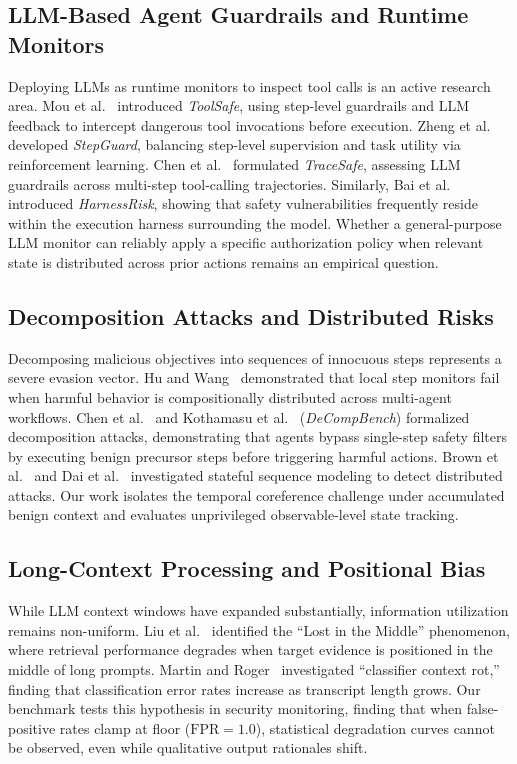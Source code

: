 \documentclass[conference]{IEEEtran}
\begin{document}
\subsection{LLM-Based Agent Guardrails and Runtime Monitors}
Deploying LLMs as runtime monitors to inspect tool calls is an active research area. Mou et al.~\cite{mou2026toolsafe} introduced \textit{ToolSafe}, using step-level guardrails and LLM feedback to intercept dangerous tool invocations before execution. Zheng et al.~\cite{zheng2026stepguard} developed \textit{StepGuard}, balancing step-level supervision and task utility via reinforcement learning. Chen et al.~\cite{chen2026tracesafe} formulated \textit{TraceSafe}, assessing LLM guardrails across multi-step tool-calling trajectories. Similarly, Bai et al.~\cite{bai2026harnessrisk} introduced \textit{HarnessRisk}, showing that safety vulnerabilities frequently reside within the execution harness surrounding the model. Whether a general-purpose LLM monitor can reliably apply a specific authorization policy when relevant state is distributed across prior actions remains an empirical question.

\subsection{Decomposition Attacks and Distributed Risks}
Decomposing malicious objectives into sequences of innocuous steps represents a severe evasion vector. Hu and Wang~\cite{hu2026compositional} demonstrated that local step monitors fail when harmful behavior is compositionally distributed across multi-agent workflows. Chen et al.~\cite{chen2026monitoring} and Kothamasu et al.~\cite{kothamasu2026hidden} (\textit{DeCompBench}) formalized decomposition attacks, demonstrating that agents bypass single-step safety filters by executing benign precursor steps before triggering harmful actions. Brown et al.~\cite{brown2026stateful} and Dai et al.~\cite{dai2026reassembling} investigated stateful sequence modeling to detect distributed attacks. Our work isolates the temporal coreference challenge under accumulated benign context and evaluates unprivileged observable-level state tracking.

\subsection{Long-Context Processing and Positional Bias}
While LLM context windows have expanded substantially, information utilization remains non-uniform. Liu et al.~\cite{liu2024lost} identified the ``Lost in the Middle'' phenomenon, where retrieval performance degrades when target evidence is positioned in the middle of long prompts. Martin and Roger~\cite{martin2026classifier} investigated ``classifier context rot,'' finding that classification error rates increase as transcript length grows. Our benchmark tests this hypothesis in security monitoring, finding that when false-positive rates clamp at floor ($\text{FPR}=1.0$), statistical degradation curves cannot be observed, even while qualitative output rationales shift.
\end{document}
